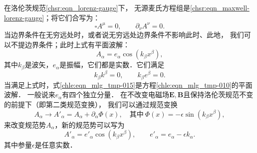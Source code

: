 在洛伦茨规范\eqref{chsr:eqn_lorenz-gauge}下，
无源麦氏方程组是\eqref{chsr:eqn_maxwell-lorenz-gauge}；将它们合写为：
\begin{equation}\label{chle:eqn_mlg_tmp-010}
    \square A^\mu =0,\qquad \partial_\nu A^\nu =0.
\end{equation}
当边界条件在无穷远处时，或者说无穷远处边界条件不影响此时、此地，
我们可以不提边界条件；此时上式有平面波解：
\begin{equation}\label{chle:eqn_mlg_tmp-015}
    A_\alpha = e_\alpha \cos(k_\beta x^\beta) ,
\end{equation}
其中$k_\beta$是波矢，$e_\alpha$是振幅，它们都是实数．它们满足
\begin{equation}\label{chle:eqn_mlg_tmp-020}
    k_\beta k^\beta =0,\qquad k_\beta e^\beta =0.
\end{equation}
当满足上式时，式\eqref{chle:eqn_mlg_tmp-015}是方程\eqref{chle:eqn_mlg_tmp-010}的平面波解．
一般说来$e_\alpha$有四个独立分量．
在不改变电磁场$\boldsymbol{E},\boldsymbol{B}$且保持洛伦茨规范不变的前提下（即第二类规范变换），
我们可以通过规范变换
\begin{equation*} %
    A_\alpha \to A'_\alpha=A_\alpha+\partial_{\alpha} \Phi(x),
    \quad{\text{其中}}\
    \Phi(x)= -\epsilon \sin(k_\beta x^\beta),
\end{equation*}
来改变规范势$A_\alpha$，新的规范势可以写为
\begin{equation}\label{chle:eqn_mlg_tmp-030}
    A'_\alpha = e'_\alpha \cos(k_\beta x^\beta),
    \qquad e'_\alpha =e_\alpha -\epsilon k_\alpha.
\end{equation}
其中参量$\epsilon$是任意实数．

